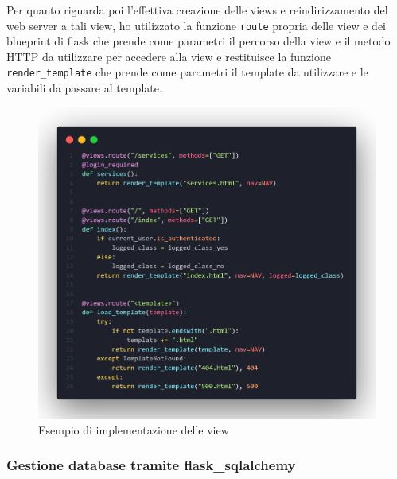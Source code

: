 \documentclass[12pt]{article}
\def\code#1{\texttt{#1}}
\begin{document}
Per quanto riguarda poi l'effettiva creazione delle views e reindirizzamento del web server a tali view, ho utilizzato la funzione \code{route} propria delle view e dei blueprint di flask che prende come parametri il percorso della view e il metodo HTTP da utilizzare per accedere alla view e restituisce la funzione \code{render\_template} che prende come parametri il template da utilizzare e le variabili da passare al template. \\
\begin{figure}[h]
    \centering
    \includegraphics[width=12cm]{views.png}
    \caption{Esempio di implementazione delle view}
\end{figure}

\newpage

\subsubsection{Gestione database tramite flask\_sqlalchemy}
\end{document}
